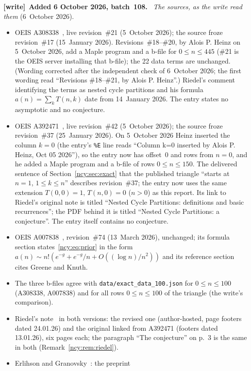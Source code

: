 \documentclass[11pt,letterpaper]{article}
\numberwithin{equation}{section}
\theoremstyle{remark}\newtheorem{remark}[theorem]{Remark}
\newcommand{\file}[1]{\nolinkurl{#1}}
\newenvironment{writenote}[1][]{\par\smallskip\begingroup\small
 \noindent\textbf{[write]}\if\relax\detokenize{#1}\relax\else~\textbf{#1.}\fi\ }%
 {\par\endgroup\smallskip}
\theoremstyle{definition}\newtheorem{definition}[theorem]{Definition}\theoremstyle{plain}
\begin{document}
\begin{writenote}[Added 6 October 2026, batch~108]
\emph{The sources, as the write read them} (6~October 2026).
\begin{itemize}\raggedright
\item OEIS A308338~\cite{oeis308338}, live revision~\#21 (5~October 2026);
 the source froze revision~\#17 (15~January 2026). Revisions~\#18--\#20, by
 Alois P. Heinz on 5~October 2026, add a Maple program and a b-file for
 $0\le n\le445$ (\#21 is the OEIS server installing that b-file); the 22 data
 terms are unchanged. \textup{(Wording corrected after the independent check
 of 6~October 2026; the first wording read ``Revisions \#18--\#21, by Alois
 P. Heinz''.)} Riedel's comment
 identifying the terms as nested cycle partitions and his formula
 $a(n)=\sum_kT(n,k)$ date from 14~January 2026. The entry states no
 asymptotic and no conjecture.
\item OEIS A392471~\cite{oeis392471}, live revision~\#42 (5~October 2026);
 the source froze revision~\#37 (25~January 2026). On 5~October 2026 Heinz
 inserted the column $k=0$ (the entry's \texttt{\%E} line reads ``Column k=0
 inserted by Alois P. Heinz, Oct 05 2026''), so the entry now has offset~$0$
 and rows from $n=0$, and he added a Maple program and a b-file of rows
 $0\le n\le150$. The delivered sentence of Section~\ref{ncy:sec:exact} that
 the published triangle ``starts at $n=1$, $1\leq k\leq n$'' describes
 revision~\#37; the entry now uses the same extension $T(0,0)=1$, $T(n,0)=0$
 ($n>0$) as this report. Its link to Riedel's original note is titled
 ``Nested Cycle Partitions: definitions and basic recurrences''; the PDF
 behind it is titled ``Nested Cycle Partitions: a conjecture''. The entry
 itself contains no conjecture.
\item OEIS A007838~\cite{oeis7838}, revision~\#74 (13~March 2026), unchanged;
 its formula section states~\eqref{ncy:eq:prior} in the form
 $a(n)\sim n!(e^{-g}+e^{-g}/n+O((\log n)/n^2))$ and its reference section
 cites Greene and Knuth.
\item The three b-files agree with \file{data/exact_data_100.json} for
 $0\le n\le100$ (A308338, A007838) and for all rows $0\le n\le100$ of the
 triangle (the write's comparison).
\item Riedel's note~\cite{riedel} in both versions: the revised one
 (author-hosted, page footers dated 24.01.26) and the original linked from
 A392471 (footers dated 13.01.26), six pages each; the paragraph
 ``The conjecture'' on p.~3 is the same in both
 (Remark~\ref{ncy:rem:riedel}).
\item Erlihson and Granovsky~\cite{eg2008}: the preprint

\end{itemize}
\end{writenote}
\end{document}

